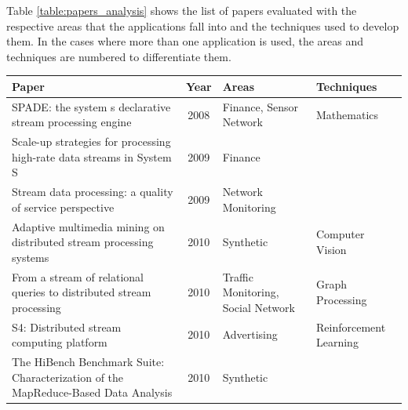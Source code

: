 \documentclass[ppgc,diss,english]{iiufrgs}
\begin{document}
Table \ref{table:papers_analysis} shows the list of papers evaluated with the respective areas that the applications fall into and the techniques used to develop them. In the cases where more than one application is used, the areas and techniques are numbered to differentiate them.



\begin{center}
	\footnotesize
	\begin{longtable}{ | p{8cm} | c | p{3cm} | p{2.5cm} |}
   		\hline
		\textbf{Paper} & \textbf{Year} & \textbf{Areas} & \textbf{Techniques} \\\hline
		
		SPADE: the system s declarative stream processing engine \cite{gedik2008spade} & 2008 & Finance, Sensor Network & Mathematics \\\hline
		Scale-up strategies for processing high-rate data streams in System S \cite{andrade2009scale} & 2009 & Finance & \\\hline
		Stream data processing: a quality of service perspective \cite{chakravarthy2009stream} & 2009 & Network Monitoring & \\\hline
		
		Adaptive multimedia mining on distributed stream processing systems \cite{turaga2010adaptive} & 2010 & Synthetic & Computer Vision \\\hline
		From a stream of relational queries to distributed stream processing \cite{zou2010stream} & 2010 & Traffic Monitoring, Social Network & Graph Processing \\\hline
		S4: Distributed stream computing platform \cite{neumeyer2010s4} & 2010 & Advertising & Reinforcement Learning \\\hline
		The HiBench Benchmark Suite: Characterization of the MapReduce-Based Data Analysis \cite{huang2010hibench} & 2010 & Synthetic & \\\hline
		

\end{longtable}
\end{center}
\end{document}
